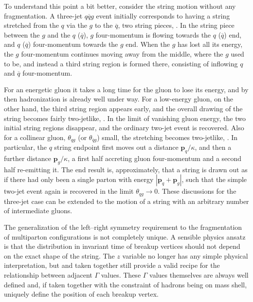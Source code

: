 To understand this point a bit better, consider the string motion
without any fragmentation. A three-jet $q\overline{q}g$ event initially 
corresponds to having a string stretched from the $q$ via the $g$ to 
the $\overline{q}$, \ie two string pieces, .
In the string piece between the $g$ and the $q$ ($\overline{q}$), 
$g$ four-momentum is flowing towards the $q$ ($\overline{q}$) end,
and $q$ ($\overline{q}$) four-momentum towards the $g$ end. When 
the $g$ has lost all its energy, the $g$ four-momentum continues 
moving away from the middle, \ie where the $g$ used to be, and 
instead a third string region is formed there, consisting of inflowing 
$q$ and $\overline{q}$ four-momentum.
  
For an energetic gluon it takes a long time for the gluon to lose its
energy, and by then hadronization is already well under way. For a 
low-energy gluon, on the other hand, the third string region 
appears early, and the overall drawing of the string becomes fairly 
two-jetlike, . In the limit of vanishing 
gluon energy, the two initial string regions disappear, and 
the ordinary two-jet event is recovered. Also for a collinear gluon, 
\ie $\theta_{qg}$ (or $\theta_{\overline{q}g}$) small, the stretching 
becomes two-jetlike, . In particular, the 
$q$ string endpoint first moves out a distance $\mathbf{p}_q / \kappa$, 
and then a further distance $\mathbf{p}_g / \kappa$, a first half 
accreting gluon four-momentum and a second half re-emitting it.
The end result is, approximately, that a string is drawn out as if
there had only been a single parton with energy 
$|\mathbf{p}_q + \mathbf{p}_g|$, such that the simple two-jet event 
again is recovered in the limit $\theta_{qg} \to 0$.
These discussions for the three-jet case can be extended to the 
motion of a string with an arbitrary number of intermediate gluons. 
  
The generalization of the left--right symmetry requirement to the
fragmentation of multiparton configurations is not completely unique. 
A sensible physics ansatz is that the distribution in 
invariant time of breakup vertices should not depend on the exact 
shape of the string. The $z$ variable no longer has any simple physical 
interpretation, but  and 
 taken together still provide a valid recipe 
for the relationship between adjacent $\Gamma$ values. These $\Gamma$ 
values themselves are always well defined and, if taken together with
the constraint of hadrons being on mass shell, uniquely define the 
position of each breakup vertex.


